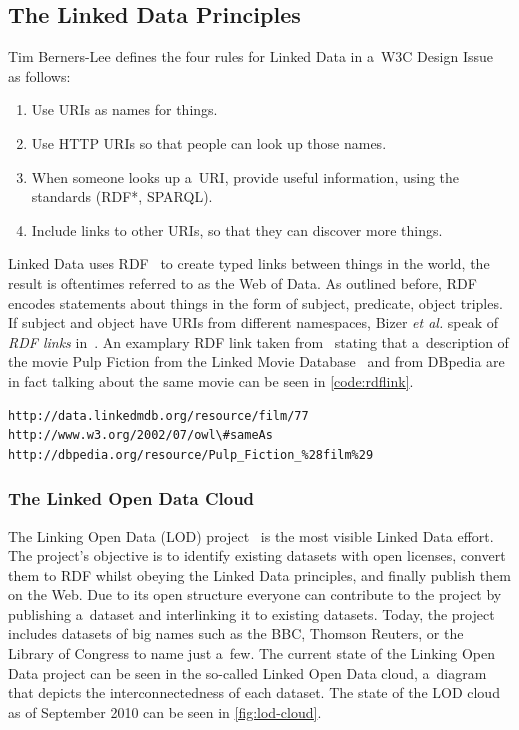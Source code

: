 \subsection{The Linked Data Principles}
Tim Berners-Lee defines the four rules for Linked Data in a~W3C Design Issue~\cite{BernersLee2006} as follows:
\begin{enumerate}
\item Use URIs as names for things.
\item Use HTTP URIs so that people can look up those names.
\item When someone looks up a~URI, provide useful information, using the standards (RDF*, SPARQL).
\item Include links to other URIs, so that they can discover more things.
\end{enumerate}

Linked Data uses RDF~\cite{Klyne2004} to create typed links between things in the world,
the result is oftentimes referred to as the Web of Data.
As outlined before, RDF encodes statements about things in the form of
subject, predicate, object triples.
If subject and object have URIs from different namespaces,
Bizer \emph{et al.} speak of \emph{RDF links} in~\cite{Bizer2007}.
An examplary RDF link taken from~\cite{Bizer2009} stating that a~description of the movie Pulp Fiction
from the Linked Movie Database~\cite{Hassanzadeh2009} and from DBpedia are in fact talking about the same movie
can be seen in \autoref{code:rdflink}.

\begin{lstlisting}[caption={[Exemplary RDF link.]{Exemplary RDF link stating that a~description of the movie Pulp Fiction from the Linked Movie Database~\cite{Hassanzadeh2009} and from DBpedia are in fact talking about the same movie.}},label={code:rdflink}]
http://data.linkedmdb.org/resource/film/77
http://www.w3.org/2002/07/owl\#sameAs
http://dbpedia.org/resource/Pulp_Fiction_%28film%29
\end{lstlisting}

\subsubsection{The Linked Open Data Cloud}\label{sec:lodcloud}
The Linking Open Data (LOD) project~\cite{Bizer2011} is the most visible Linked Data effort.
The project's objective is to identify existing datasets with open licenses,
convert them to RDF whilst obeying the Linked Data principles, and finally publish them on the Web.
Due to its open structure everyone can contribute to the project by publishing a~dataset and
interlinking it to existing datasets.
Today, the project includes datasets of big names such as the BBC, Thomson Reuters,
or the Library of Congress to name just a~few.
The current state of the Linking Open Data project can be seen in the so-called Linked Open Data cloud,
a~diagram that depicts the interconnectedness of each dataset.
The state of the LOD cloud as of September 2010 can be seen in \autoref{fig:lod-cloud}.

